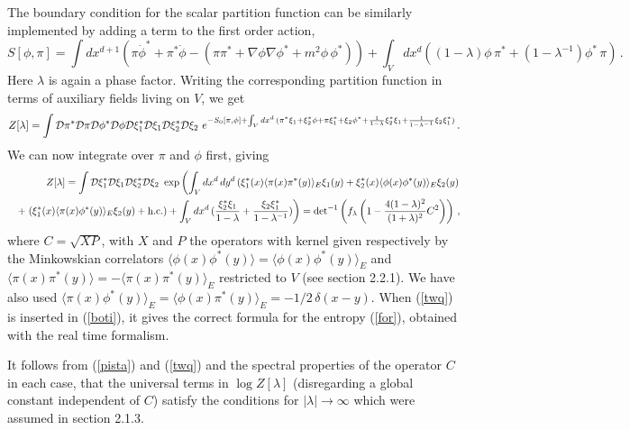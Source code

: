 \documentclass[a4paper]{article}
\begin{document}
The boundary condition for the scalar partition function can be similarly implemented by adding a term to the  first order action, 
\begin{equation}
S[\phi,\pi]=\int dx^{d+1} \left(\pi\dot{\phi}^*+\pi^*\dot{\phi}-\left(\pi \pi^*+\nabla\phi \nabla \phi^*+m^2 \phi \,\phi^*\right)\right)+\int_V dx^d ((1-\lambda) \phi\, \pi^*+(1-\lambda^{-1}) \phi^*\, \pi)\,.
\end{equation}    
Here $\lambda$ is again a phase factor.    
Writing the corresponding partition function in terms of auxiliary fields living on $V$, we get
 \begin{equation}
 Z[\lambda]=\int {\cal D}\pi^*{\cal D}\pi{\cal D}\phi^*{\cal D}\phi{\cal D}\xi_1^* {\cal D}\xi_1{\cal D}\xi_2^* {\cal D}\xi_2\,\, e^{-S_0[\pi,\phi]+\int_V dx^d\, (\pi^* \xi_1 +\xi_2^* \phi +\pi \xi_1^* +\xi_2 \phi^* +\frac{1}{1-\lambda} \xi_2^* \xi_1+\frac{1}{1-\lambda^{-1}} \xi_2 \xi_1^*)}\,.
 \label{nio}\end{equation}
We can now integrate over $\pi$ and $\phi$ first, giving
\begin{eqnarray}
 && Z[\lambda]=\int {\cal D}\xi_1^* {\cal D}\xi_1{\cal D}\xi_2^* {\cal D}\xi_2\,\, \exp\left(\int_V dx^d \, dy^d\,( \xi_1^*(x)\langle\pi(x)\pi^*(y) \rangle_E \xi_1(y)+\xi_2^*(x)\langle\phi(x)\phi^*(y) \rangle_E \xi_2(y)\right.  \label{twq}\\ &&+\left.(\xi_1^*(x)\langle\pi(x)\phi^*(y)\rangle_E\xi_2(y)+\textrm{h.c.})+\int_V dx^d \,(\frac{\xi_2^* \xi_1}{1-\lambda} +\frac{\xi_2 \xi_1^*}{1-\lambda^{-1}}) \right)= \textrm{det}^{-1}\left(f_\lambda\left(1- \frac{4(1-\lambda)^2}{(1+\lambda)^2}C^2\right)\right)\,,\nonumber
\end{eqnarray}
where $C=\sqrt{XP}$, with $X$ and $P$ the operators with kernel given respectively by the Minkowskian correlators $\langle\phi(x)\phi^*(y) \rangle=\langle\phi(x)\phi^*(y) \rangle_E$ and $\langle\pi(x)\pi^*(y) \rangle=-\langle\pi(x)\pi^*(y) \rangle_E$ restricted to $V$ (see section 2.2.1). We have also used $\langle\pi(x) \phi^*(y) \rangle_E=\langle\phi(x) \pi^*(y) \rangle_E=-1/2 \,\delta(x-y)$. When (\ref{twq}) is inserted in (\ref{boti}), it gives the correct formula for the entropy (\ref{for}), obtained with the real time formalism.  

It follows from (\ref{pista}) and (\ref{twq}) and the spectral properties of the operator $C$ in each case, that the universal terms in $\log Z[\lambda]$ (disregarding a global constant independent of $C$) satisfy the conditions for $|\lambda|\rightarrow \infty$ which were assumed in section 2.1.3. 
\end{document}
